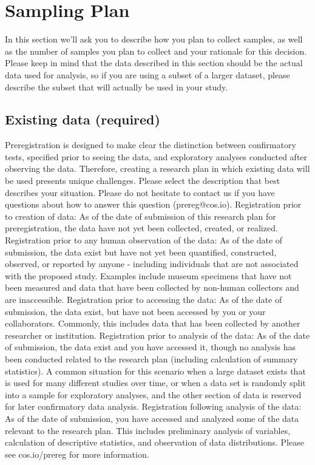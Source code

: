 \documentclass[
10pt, %
a4paper, %
oneside, %
headinclude,footinclude, %
BCOR5mm, %
]{scrartcl}
\begin{document}
\section{Sampling Plan}

In this section we’ll ask you to describe how you plan to collect samples, as well as the number of samples you plan to collect and your rationale for this decision. Please keep in mind that the data described in this section should be the actual data used for analysis, so if you are using a subset of a larger dataset, please describe the subset that will actually be used in your study.

\subsection{Existing data (required)}
Preregistration is designed to make clear the distinction between confirmatory tests, specified prior to seeing the data, and exploratory analyses conducted after observing the data. Therefore, creating a research plan in which existing data will be used presents unique challenges. Please select the description that best describes your situation. Please do not hesitate to contact us if you have questions about how to answer this question (prereg@cos.io).
Registration prior to creation of data: As of the date of submission of this research plan for preregistration, the data have not yet been collected, created, or realized. 
Registration prior to any human observation of the data: As of the date of submission, the data exist but have not yet been quantified, constructed, observed, or reported by anyone - including individuals that are not associated with the proposed study. Examples include museum specimens that have not been measured and data that have been collected by non-human collectors and are inaccessible.
Registration prior to accessing the data: As of the date of submission, the data exist, but have not been accessed by you or your collaborators. Commonly, this includes data that has been collected by another researcher or institution.
Registration prior to analysis of the data: As of the date of submission, the data exist and you have accessed it, though no analysis has been conducted related to the research plan (including calculation of summary statistics). A common situation for this scenario when a large dataset exists that is used for many different studies over time, or when a data set is randomly split into a sample for exploratory analyses, and the other section of data is reserved for later confirmatory data analysis.
Registration following analysis of the data: As of the date of submission, you have accessed and analyzed some of the data relevant to the research plan. This includes preliminary analysis of variables, calculation of descriptive statistics, and observation of data distributions. Please see cos.io/prereg for more information. 
\end{document}
